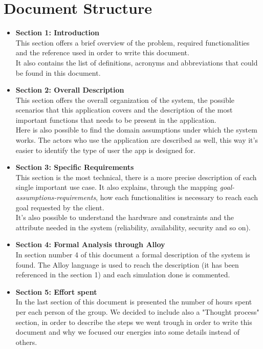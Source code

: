 \documentclass[10pt]{report}
\begin{document}
    \section{Document Structure}
    \begin{itemize}
        \item \textbf{Section 1: Introduction}\\
        This section offers a brief overview of the problem, required functionalities and the reference used in order to write this document.\\
        It also contains the list of definitions, acronyms and abbreviations that could be found in this document.\\
        \item \textbf{Section 2: Overall Description}\\
        This section offers the overall organization of the system, the possible scenarios that this application covers and the description of the most important functions that needs to be present in the application.\\
        Here is also possible to find the domain assumptions under which the system works. The actors who use the application are described as well, this way it's easier to identify the type of user the app is designed for.
        \item \textbf{Section 3: Specific Requirements}\\
        This section is the most technical, there is a more precise description of each single important use case. It also explains, through the mapping \textit{goal-assumptions-requirements}, how each functionalities is necessary to reach each goal requested by the client.\\
        It's also possible to understand the hardware and constraints and the attribute needed in the system (reliability, availability, security and so on).
        \item \textbf{Section 4: Formal Analysis through Alloy} \\
        In section number 4 of this document a formal description of the system is found. The Alloy language is used to reach the description (it has been referenced in the section 1) and each simulation done is commented.
        \item \textbf{Section 5: Effort spent} \\
        In the last section of this document is presented the number of hours spent per each person of the group. We decided to include also a "Thought process" section, in order to describe the steps we went trough in order to write this document and why we focused our energies into some details instead of others.
    \end{itemize}
\end{document}
